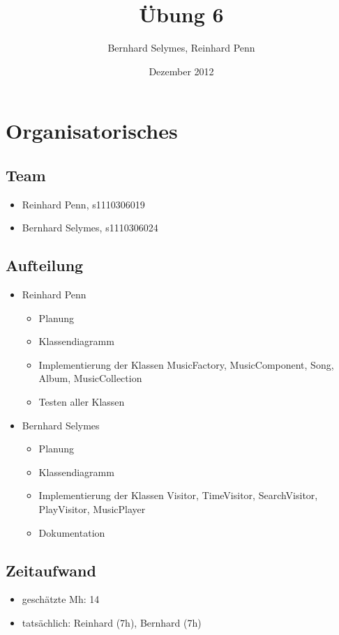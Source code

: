 \documentclass[12pt,a4paper]{article}
\begin{document}
\title{Übung 6}
\author{Bernhard Selymes, Reinhard Penn}
\date{Dezember 2012}

\normalsize

\newcommand{\CodePath}{../MusicPlayer/MusicPlayer/}

\section{Organisatorisches}

\subsection{Team}
	\begin {itemize} 
		\item Reinhard Penn, s1110306019 
		\item Bernhard Selymes, s1110306024
	\end {itemize}

\subsection{Aufteilung}
	\begin {itemize} 
		\item Reinhard Penn
			\begin {itemize}
				\item Planung
				\item Klassendiagramm
				\item Implementierung der Klassen MusicFactory, MusicComponent, Song, Album, MusicCollection
				\item Testen aller Klassen
			\end {itemize}
		\item Bernhard Selymes
			\begin {itemize}
				\item Planung
				\item Klassendiagramm
				\item Implementierung der Klassen Visitor, TimeVisitor, SearchVisitor, PlayVisitor, MusicPlayer
				\item Dokumentation		
			\end {itemize}
	\end {itemize}


\subsection{Zeitaufwand}
	\begin {itemize}
		\item geschätzte Mh: 14
		\item tatsächlich: Reinhard (7h), Bernhard  (7h)
	\end {itemize}
\end{document}
